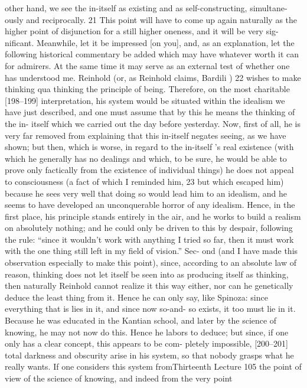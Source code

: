 other hand, we see the in-itself as existing and as self-constructing, simultane-
ously and reciprocally. 21 This point will have to come up again naturally as the
higher point of disjunction for a still higher oneness, and it will be very sig-
nificant. Meanwhile, let it be impressed [on you], and, as an explanation, let
the following historical commentary be added which may have whatever
worth it can for admirers. At the same time it may serve as an external test of
whether one has understood me.
Reinhold (or, as Reinhold claims, Bardili ) 22 wishes to make thinking qua
thinking the principle of being. Therefore, on the most charitable [198–199]
interpretation, his system would be situated within the idealism we have just
described, and one must assume that by this he means the thinking of the in-
itself which we carried out the day before yesterday. Now, first of all, he is very
far removed from explaining that this in-itself negates seeing, as we have
shown; but then, which is worse, in regard to the in-itself ’s real existence (with
which he generally has no dealings and which, to be sure, he would be able to
prove only factically from the existence of individual things) he does not
appeal to consciousness (a fact of which I reminded him, 23 but which escaped
him) because he sees very well that doing so would lead him to an idealism,
and he seems to have developed an unconquerable horror of any idealism.
Hence, in the first place, his principle stands entirely in the air, and he works
to build a realism on absolutely nothing; and he could only be driven to this
by despair, following the rule: “since it wouldn’t work with anything I tried so
far, then it must work with the one thing still left in my field of vision.” Sec-
ond (and I have made this observation especially to make this point), since,
according to an absolute law of reason, thinking does not let itself be seen into
as producing itself as thinking, then naturally Reinhold cannot realize it this
way either, nor can he genetically deduce the least thing from it. Hence he can
only say, like Spinoza: since everything that is lies in it, and since now so-and-
so exists, it too must lie in it. Because he was educated in the Kantian school,
and later by the science of knowing, he may not now do this. Hence he labors
to deduce; but since, if one only has a clear concept, this appears to be com-
pletely impossible, [200–201] total darkness and obscurity arise in his system,
so that nobody grasps what he really wants. If one considers this system fromThirteenth Lecture
105
the point of view of the science of knowing, and indeed from the very point

